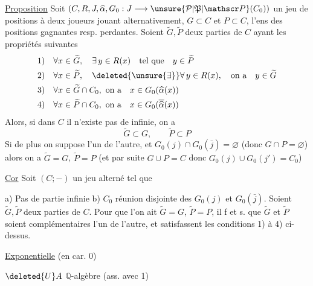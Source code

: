 \uline{Proposition} Soit $(C,R,J,\widehat\alpha,G_0:J\longrightarrow\unsure{\mathcal P|\mathfrak P|\mathscr P}(C_0))$ un jeu de positions à deux joueurs jouant alternativement, $G\subset C$ et $P\subset C$, l'ens des positions gagnantes resp. perdantes. Soient $\widetilde G,\widetilde P$ deux parties de $C$ ayant les propriétés suivantes
\[
\begin{aligned}
1)\quad &\forall x\in\widetilde G,\quad\exists\,y\in R(x)\quad\text{tel que}\quad y\in\widetilde P\\
2)\quad &\forall x\in\widetilde P,\quad\deleted{\unsure{\exists}}\forall\,y\in R(x),\quad\text{on a}\quad y\in\widetilde G\\
3)\quad &\forall x\in\widetilde G\cap C_0,\ \text{on a}\quad x\in G_0(\widehat\alpha(x))\\
4)\quad &\forall x\in\widetilde P\cap C_0,\ \text{on a}\quad x\in G_0(\overline{\widehat\alpha}(x))
\end{aligned}
\]
Alors, si dans $C$ il n'existe pas de  infinie, on a
\[
\widetilde G\subset G,\qquad\widetilde P\subset P
\]
Si de plus on suppose   l'un de l'autre,  et $G_0(j)\cap G_0(\bar j)=\varnothing$ (donc $G\cap P=\varnothing$) alors on a $\widetilde G=G$, $\widetilde P=P$ (et par suite $G\cup P=C$ donc $G_0(j)\cup G_0(j')=C_0$)

\uline{Cor} Soit $(C;-)$ un jeu alterné tel que 

a) Pas de partie infinie \qquad b) $C_0$ réunion disjointe des $G_0(j)$ et $G_0(\bar j)$. Soient $\widetilde G,\widetilde P$ deux parties de $C$. Pour que l'on ait $\widetilde G=G$, $\widetilde P=P$, il f et s. que $\widetilde G$ et $\widetilde P$ soient complémentaires l'un de l'autre, et satisfassent les conditions 1) à 4) ci-dessus.

\uline{Exponentielle} (en car. 0)

 

$\deleted{U}A$ $\mathbb Q$-algèbre (ass. avec 1)

